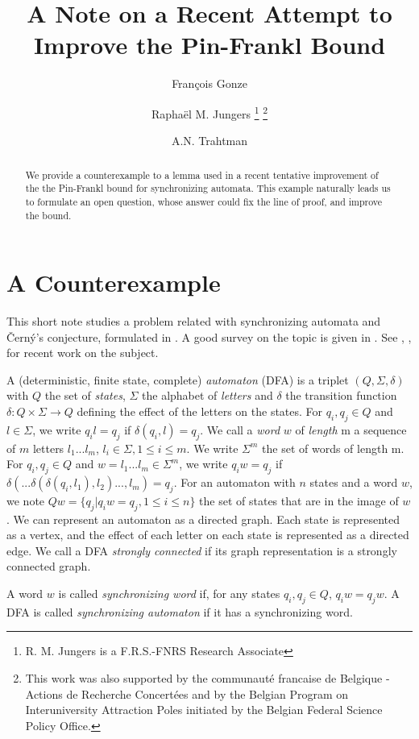 \documentclass{llncs}
\title{
A Note on a Recent Attempt to Improve the Pin-Frankl Bound
}
\author{Fran\c cois Gonze \inst{1} \and Rapha\"el M. Jungers \inst{1} \thanks{R. M. Jungers is a F.R.S.-FNRS Research Associate}
\thanks{This work was also supported by the communaut\'e francaise de Belgique - Actions de Recherche Concert\'ees and by the Belgian Program on Interuniversity Attraction Poles initiated by the Belgian Federal Science Policy Office.} \and A.N. Trahtman \inst{2}}
\institute{ICTEAM Institute\\
UCLouvain, Louvain La Neuve, Belgium\\
 \email{$\{$francois.gonze,raphael.jungers$\}$@uclouvain.be}\\
\and 
 Dep. of Math.\\
Bar-Ilan University, 52900, Ramat Gan, Israel\\
 \email{trakht@macs.biu.ac.il} 
 }
\begin{document}
\maketitle
\begin{abstract}

We provide a counterexample to a lemma used in a recent tentative improvement of the the Pin-Frankl bound for synchronizing automata. This example naturally leads us to formulate an open question, whose answer could fix the line of proof, and improve the bound.

\end{abstract}


\section*{A Counterexample}

This short note studies a problem related with synchronizing automata and \v Cern{\'y}'s conjecture, formulated in \cite{Cerny64}.
A good survey on the topic is given in \cite{volkov_survey}. See \cite{JungersBlondelOlshevsky14}, \cite{ArxivPrep}, \cite{jungers_sync_12} for recent work on the subject.

A (deterministic, finite state, complete) \emph{automaton} (DFA) is a triplet $(Q,\Sigma, \delta)$ with $Q$ the set of \emph{states}, $\Sigma$ the alphabet of \emph{letters} and $\delta$ the transition function $\delta: Q\times \Sigma \rightarrow Q$ defining the effect of the letters on the states. For $q_i, q_j \in Q$ and $l \in \Sigma$, we write $q_il=q_j$ if $\delta(q_i, l)=q_j$. We call a \emph{word} $w$ of \emph{length} m a sequence of $m$ letters $l_1 ... l_m$, $l_i \in \Sigma, 1\leq i\leq m$. We write $\Sigma^m$ the set of words of length m. For $q_i, q_j \in Q$ and $w= l_1 ... l_m \in \Sigma^m$, we write $q_i w=q_j$ if $\delta(...\delta(\delta(q_i, l_1),l_2)...,l_m)=q_j$. For an automaton with $n$ states and a word $w$, we note $Qw=\{q_j|q_iw=q_j, 1\leq i \leq n\}$ the set of states that are in the image of $w$. We can represent an automaton as a directed graph. Each state is represented as a vertex, and the effect of each letter on each state is represented as a directed edge. We call a DFA \emph{strongly connected} if its graph representation is a strongly connected graph.

A word $w$ is called \emph{synchronizing word} if, for any states $q_i, q_j \in Q$, $q_iw=q_jw$. A DFA is called \emph{synchronizing automaton} if it has a synchronizing word.
\end{document}

